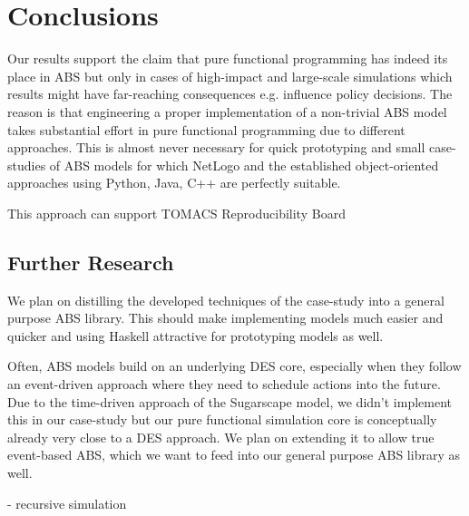 \section{Conclusions}
\label{sec:conclusions}
Our results support the claim that pure functional programming has indeed its place in ABS but only in cases of high-impact and large-scale simulations which results might have far-reaching consequences e.g. influence policy decisions. The reason is that engineering a proper implementation of a non-trivial ABS model takes substantial effort in pure functional programming due to different approaches. This is almost never necessary for quick prototyping and small case-studies of ABS models for which NetLogo and the established object-oriented approaches using Python, Java, C++ are perfectly suitable.

This approach can support TOMACS Reproducibility Board

\subsection{Further Research}
We plan on distilling the developed techniques of the case-study into a general purpose ABS library. This should make implementing models much easier and quicker and using Haskell attractive for prototyping models as well. 

Often, ABS models build on an underlying DES core, especially when they follow an event-driven approach \cite{meyer_event-driven_2014} where they need to schedule actions into the future. Due to the time-driven approach of the Sugarscape model, we didn't implement this in our case-study but our pure functional simulation core is conceptually already very close to a DES approach. We plan on extending it to allow true event-based ABS, which we want to feed into our general purpose ABS library as well.

- recursive simulation